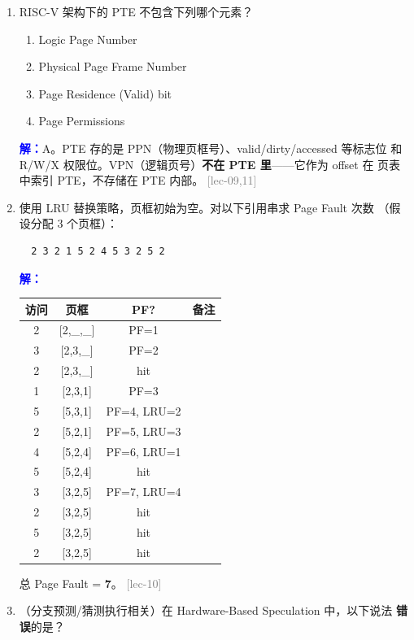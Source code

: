 \documentclass[11pt,a4paper]{article}
\newcommand{\lec}[1]{\textcolor{gray}{[lec-#1]}}
\newcommand{\ans}{\par\noindent\textcolor{blue}{\textbf{解：}}}
\begin{document}
\begin{enumerate}[leftmargin=*,itemsep=8pt]
  \ans B。虚拟地址空间可以远超物理内存（按需调页），每个进程有独立页表，
  交换空间只是虚拟内存的实现手段之一，不是等价概念。 \lec{10}

\item RISC-V 架构下的 PTE 不包含下列哪个元素？

  \begin{enumerate}[label=\Alph*.]
    \item Logic Page Number
    \item Physical Page Frame Number
    \item Page Residence (Valid) bit
    \item Page Permissions
  \end{enumerate}

  \ans A。PTE 存的是 PPN（物理页框号）、valid/dirty/accessed 等标志位
  和 R/W/X 权限位。VPN（逻辑页号）\textbf{不在 PTE 里}——它作为 offset 在
  页表中索引 PTE，不存储在 PTE 内部。 \lec{09,11}

\item 使用 LRU 替换策略，页框初始为空。对以下引用串求 Page Fault 次数
  （假设分配 3 个页框）：

  \begin{verbatim}
  2 3 2 1 5 2 4 5 3 2 5 2
  \end{verbatim}

  \ans
  \begin{tabular}{c|c|c|c}
  访问 & 页框 & PF? & 备注 \\
  \midrule
  2 & [2,\_,\_]       & PF=1 \\
  3 & [2,3,\_]        & PF=2 \\
  2 & [2,3,\_]        & hit \\
  1 & [2,3,1]         & PF=3 \\
  5 & [5,3,1]         & PF=4, LRU=2 \\
  2 & [5,2,1]         & PF=5, LRU=3 \\
  4 & [5,2,4]         & PF=6, LRU=1 \\
  5 & [5,2,4]         & hit \\
  3 & [3,2,5]         & PF=7, LRU=4 \\
  2 & [3,2,5]         & hit \\
  5 & [3,2,5]         & hit \\
  2 & [3,2,5]         & hit \\
  \end{tabular}

  总 Page Fault = \textbf{7}。 \lec{10}

\item （分支预测/猜测执行相关）在 Hardware-Based Speculation 中，以下说法
  \textbf{错误}的是？


\end{enumerate}
\end{document}
